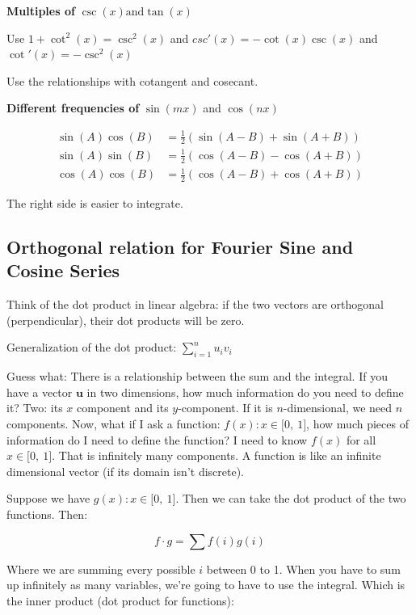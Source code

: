 \documentclass[12pt]{article}
\theoremstyle{plain}
\theoremstyle{remark}
\theoremstyle{definition}
\begin{document}
\textbf{Multiples of} \(\csc(x)\text{and}\tan(x)\)

Use \(1 + \cot^{2}(x) = \csc^{2}(x)\) and
\(csc'(x) = - \cot(x)\csc(x)\) and
\(\cot{'(x)} = - \csc^{2}(x)\)

Use the relationships with cotangent and cosecant.

\textbf{Different frequencies of} \(\sin\left( mx \right)\) and
\(\cos\left( nx \right)\)

\begin{align*}
\sin(A)\cos(B) &= \frac{1}{2}\left( \sin(A - B) + \sin(A + B) \right) \\
\sin(A)\sin(B) &= \frac{1}{2}\left( \cos(A - B) - \cos(A + B) \right) \\
\cos(A)\cos(B) &= \frac{1}{2}\left( \cos(A - B) + \cos(A + B) \right)
\end{align*}


The right side is easier to integrate.


\subsection{Orthogonal relation for Fourier Sine and Cosine
Series}

Think of the dot product in linear algebra: if the two vectors are
orthogonal (perpendicular), their dot products will be zero.

Generalization of the dot product: \(\sum_{i = 1}^{n}{u_{i}v_{i}}\)

Guess what: There is a relationship between the sum and the integral. If
you have a vector \(\mathbf{u}\) in two dimensions, how much
information do you need to define it? Two: its \(x\) component and its
\(y\)-component. If it is \(n\)-dimensional, we need \(n\) components.
Now, what if I ask a function: \(f(x):x \in \lbrack 0,\ 1\rbrack\), how
much pieces of information do I need to define the function? I need to
know \(f(x)\) for all \(x \in \lbrack 0,\ 1\rbrack\). That is infinitely
many components. A function is like an infinite dimensional vector (if
its domain isn't discrete).

Suppose we have \(g(x):x \in \lbrack 0,\ 1\rbrack\). Then we can take
the dot product of the two functions. Then:

\[f \cdot g = \sum f(i)g(i)\]

Where we are summing every possible \(i\) between 0 to 1. When you have
to sum up infinitely as many variables, we're going to have to use the
integral. Which is the inner product (dot product for functions):
\end{document}

